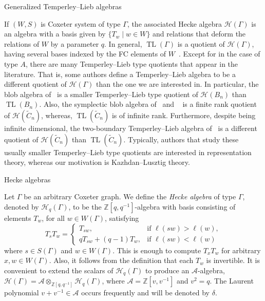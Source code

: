\documentclass[11pt]{amsart}
\theoremstyle{definition}
\numberwithin{equation}{section}
\newcommand{\Z}{\mathbb{Z}}
\newcommand{\A}{\mathcal{A}}
\newcommand{\C}{\widetilde{C}}
\DeclareMathOperator{\TL}{TL}
\renewcommand{\(}{\left(}
\renewcommand{\)}{\right)}
\renewcommand{\H}{\mathcal{H}}
\begin{document}
\begin{section}{Generalized Temperley--Lieb algebras}\label{sec:gen TL-algebras}

If $(W,S)$ is Coxeter system of type $\Gamma$, the associated Hecke algebra $\H(\Gamma)$ is an algebra with a basis given by $\{T_w\mid w \in W\}$ and relations that deform the relations of $W$ by a parameter $q$. In general, $\TL(\Gamma)$ is a quotient of $\H(\Gamma)$, having several bases indexed by the FC elements of $W$~\cite[Theorem 6.2]{Graham1995}.  Except for in the case of type $A$, there are many Temperley--Lieb type quotients that appear in the literature.  That is,  some authors define a Temperley--Lieb algebra to be a different quotient of $\H(\Gamma)$ than the one we are interested in.  In particular, the blob algebra of~\cite{Martin1994} is a smaller Temperley--Lieb type quotient of $\H(B_{n})$ than $\TL(B_{n})$.  Also, the symplectic blob algebra of~\cite{Green2012} and ~\cite{Martin2007} is a finite rank quotient of $\H(\C_{n})$, whereas, $\TL(\C_{n})$ is of infinite rank.  Furthermore, despite being infinite dimensional, the two-boundary Temperley--Lieb algebra of~\cite{Gier2009} is a different quotient of $\H(\C_n)$ than $\TL(\C_{n})$.  Typically, authors that study these usually smaller Temperley--Lieb type quotients are interested in representation theory, whereas our motivation is Kazhdan--Lusztig theory.


\begin{subsection}{Hecke algebras}

Let $\Gamma$ be an arbitrary Coxeter graph.  We define the \emph{Hecke algebra} of type $\Gamma$, denoted by $\H_{q}(\Gamma)$, to be the $\Z[q,q^{-1}]$-algebra with basis consisting of elements $T_{w}$, for all $w \in W(\Gamma)$, satisfying
\[
T_{s}T_{w}=\begin{cases}
T_{sw},  & \text{if } \ell(sw)>\ell(w), \\
qT_{sw}+(q-1)T_{w},  & \text{if } \ell(sw)<\ell(w)
\end{cases}
\]
where $s \in S(\Gamma)$ and $w \in W(\Gamma)$.  This is enough to compute $T_{x}T_{w}$ for arbitrary $x, w \in W(\Gamma)$.  Also, it follows from the definition that each $T_{w}$ is invertible.  It is convenient to extend the scalars of $\H_{q}(\Gamma)$ to produce an $\A$-algebra, $\H(\Gamma)=\A \otimes_{\Z[q,q^{-1}]} \H_{q}(\Gamma)$, where $\A=\Z[v,v^{-1}]$ and $v^{2}=q$.  The Laurent polynomial $v+v^{-1} \in \A$ occurs frequently and will be denoted by $\delta$.  


\end{subsection}
\end{section}
\end{document}

